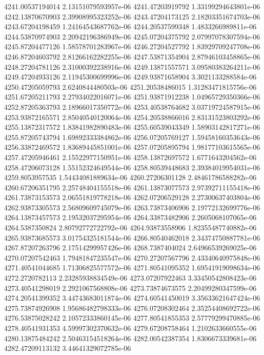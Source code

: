 {4241.00537194014 2.13151079593957e-06
4241.47203919792 1.33199294643801e-06
4242.13870670903 2.39908995323252e-06
4243.47204173125 2.18203351674703e-06
4243.67204198459 1.24164543687762e-06
4244.20537599348 1.4833266989811e-06
4244.53870974903 2.20942196386949e-06
4245.07204375792 2.07997078307594e-06
4245.87204477126 1.58578701283967e-06
4246.27204527792 1.83929709247708e-06
4246.87204603792 2.81266162282255e-06
4247.53871354904 2.87946103458865e-06
4248.27204781126 2.31000392238916e-06
4249.13871557571 3.09580383264211e-06
4249.47204933126 2.11945300699996e-06
4249.93871658904 3.3021133288584e-06
4250.47205059793 2.6240844480503e-06
4251.20538486015 1.31283471815756e-06
4251.67205211793 2.27934022016071e-06
4251.93871912238 1.04965729350366e-06
4252.87205363793 2.18966017350772e-06
4253.40538764682 3.03719724587915e-06
4253.93872165571 2.85040540120064e-06
4254.20538866016 2.83131523803292e-06
4255.13872317572 1.83841982890483e-06
4255.60539043349 1.58903142817271e-06
4255.87205743794 1.69892333384862e-06
4256.07205769127 1.59458160353643e-06
4256.33872469572 1.83689445851001e-06
4257.07205895794 1.98177103615565e-06
4257.47205946461 2.15522977150951e-06
4258.13872697572 1.6771643204562e-06
4258.47206073128 1.55152324649544e-06
4258.80539448683 2.39384019954031e-06
4259.8053957535 1.54434081889634e-06
4260.27206301128 2.48461786588282e-06
4260.67206351795 2.25748404155518e-06
4261.13873077573 2.97392711155418e-06
4261.73873153573 2.06551819778218e-06
4262.07206529128 2.27300637403804e-06
4262.93873305573 2.56809609745079e-06
4263.73873406906 2.19772132699776e-06
4264.13873457573 2.19532037295954e-06
4264.33873482906 2.2605068107065e-06
4264.5387350824 2.80792772722792e-06
4264.93873558906 1.82355487740882e-06
4265.93873685573 3.01754325181544e-06
4266.80540462018 2.34374750887781e-06
4267.87207263796 2.17514299957426e-06
4268.7387404024 2.64966539269025e-06
4270.07207542463 1.79481847235547e-06
4270.27207567796 2.43340640975848e-06
4271.40541044685 1.71306825577572e-06
4271.80541095352 1.69541919098634e-06
4272.2720782113 2.23285938834549e-06
4273.07207922463 3.33450542808423e-06
4273.40541298019 2.2921067568808e-06
4273.73874673575 2.20499280347599e-06
4274.20541399352 3.44743683011874e-06
4274.60541450019 3.35633621647424e-06
4275.73874926908 1.95686482798333e-06
4276.07208302464 2.35254408692722e-06
4276.53875028242 2.10572333860145e-06
4277.80541855353 2.57779299470885e-06
4278.40541931353 4.59997302370632e-06
4279.67208758464 1.2102633660555e-06
4280.13875484242 2.50463154518264e-06
4282.00542387354 1.8306673339681e-06
4282.47209113132 3.44641329072785e-06
}
